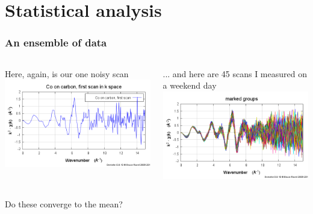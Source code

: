 \documentclass[10pt, xcolor=x11names, compress]{beamer}
\begin{document}
\section{Statistical analysis}

\begin{frame}
  \frametitle{An ensemble of data}
  \begin{columns}[T]
    \begin{column}{0.5\linewidth}
      \centering Here, again, is our one noisy scan\\[2.5ex]
      \includegraphics[width=\linewidth]{images/firstscan.png}
    \end{column}
    \begin{column}{0.5\linewidth}
      \centering ... and here are 45 scans I measured on a weekend day\\
      \includegraphics[width=\linewidth]{images/manyscans.png}
    \end{column}
  \end{columns}
  \begin{block}{}
    \centering Do these converge to the mean?
  \end{block}
\end{frame}
\end{document}
